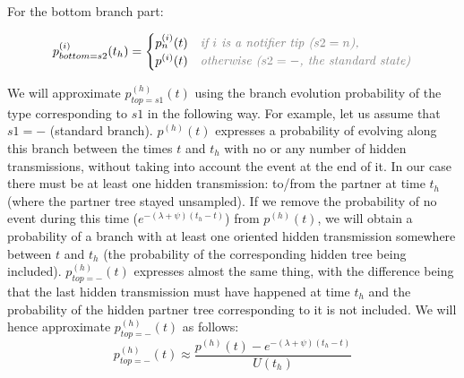 \documentclass[a4paper,10pt]{article}
\begin{document}
For the bottom branch part: 

\begin{equation}
p_{bottom=s2}^{(i)}(t_h) = 
\begin{cases}
p_n^{(i)}(t)&\textit{\color{gray} if $i$ is a notifier tip ($s2=n$),}\\
p^{(i)}(t)&\textit{\color{gray} otherwise ($s2=-$, the standard state)}\\
\end{cases}
\end{equation}

We will approximate $p_{top=s1}^{(h)}(t)$ using the branch evolution probability of the type corresponding to $s1$  in the following way. For example, let us assume that $s1=-$ (standard branch). $p^{(h)}(t)$ expresses a probability of evolving along this branch between the times $t$ and $t_h$ with no or any number of hidden transmissions, without taking into account the event at the end of it. In our case there must be at least one hidden transmission: to/from the partner at time $t_h$ (where the partner tree stayed unsampled). If we remove the probability of no event during this time ($e^{-(\lambda + \psi)(t_h - t)}$) from $p^{(h)}(t)$, we will obtain a probability of a branch with at least one oriented hidden transmission somewhere between $t$ and $t_h$ (the probability of the corresponding hidden tree being included). $p_{top=-}^{(h)}(t)$ expresses almost the same thing, with the difference being that the last hidden transmission must have happened at time $t_h$ and the probability of the hidden partner tree corresponding to it is not included. We will hence approximate $p_{top=-}^{(h)}(t)$ as follows: 
\begin{equation}
p_{top=-}^{(h)}(t) \approx \frac{p^{(h)}(t) -e^{-(\lambda + \psi)(t_{h} - t)}}{U(t_{h})}
\end{equation}
\end{document}

